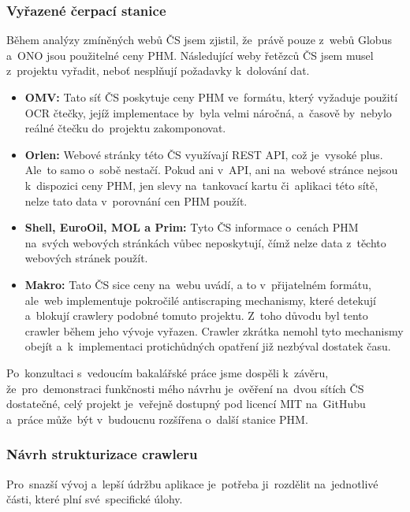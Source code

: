 \subsubsection{Vyřazené čerpací stanice}
\label{sec:preps-removed-stations}

Během analýzy zmíněných webů ČS jsem zjistil, že~právě pouze z~webů
Globus a~ONO jsou použitelné ceny PHM. Následující weby řetězců ČS
jsem musel z~projektu vyřadit, neboť nesplňují požadavky k~dolování dat.

\begin{itemize}
    \item \textbf{OMV:} Tato síť ČS poskytuje ceny PHM ve~formátu,
        který vyžaduje použití OCR čtečky, jejíž implementace
        by~byla velmi náročná, a~časově by~nebylo reálné čtečku
        do~projektu zakomponovat.
    \item \textbf{Orlen:} Webové stránky této ČS využívají REST API,
        což je~vysoké plus. Ale~to samo o~sobě nestačí. Pokud ani
        v~API, ani na~webové stránce nejsou k~dispozici ceny PHM,
        jen slevy na~tankovací kartu či~aplikaci této sítě, nelze
        tato data v~porovnání cen PHM použít.
    \item \textbf{Shell, EuroOil, MOL a Prim:} Tyto ČS informace
        o~cenách PHM na~svých webových stránkách vůbec neposkytují,
        čímž nelze data z~těchto webových stránek použít.
    \item \textbf{Makro:} Tato ČS sice ceny na~webu uvádí, a to
        v~přijatelném formátu, ale~web implementuje pokročilé
        antiscraping mechanismy, které detekují a~blokují crawlery
        podobné tomuto projektu. Z~toho důvodu byl tento crawler
        během jeho vývoje vyřazen. Crawler zkrátka nemohl tyto
        mechanismy obejít a~k~implementaci protichůdných opatření
        již nezbýval dostatek času.
\end{itemize}

Po~konzultaci s~vedoucím bakalářské práce jsme dospěli k~závěru,
že~pro~demonstraci funkčnosti mého návrhu je~ověření na~dvou sítích ČS
dostatečné, celý projekt je~veřejně dostupný pod licencí MIT na~GitHubu
a~práce může~být v~budoucnu rozšířena o~další stanice PHM.

\subsubsection{Návrh strukturizace crawleru}
\label{sec:preps-crawler-structure}

Pro~snazší vývoj a~lepší údržbu aplikace je~potřeba ji~rozdělit na~jednotlivé
části, které plní své~specifické úlohy.

